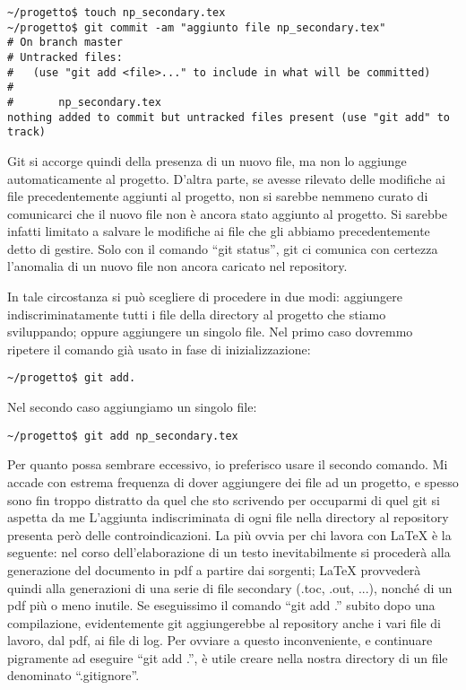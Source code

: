 \documentclass[a4paper,12pt,oneside]{article}
\begin{document}
\begin{lstlisting}
~/progetto$ touch np_secondary.tex
~/progetto$ git commit -am "aggiunto file np_secondary.tex"
# On branch master
# Untracked files:
#   (use "git add <file>..." to include in what will be committed)
#
#       np_secondary.tex
nothing added to commit but untracked files present (use "git add" to track)
\end{lstlisting}

Git si accorge quindi della presenza di un nuovo file, ma non lo aggiunge
automaticamente al progetto. D'altra parte, se avesse rilevato delle modifiche
ai file precedentemente aggiunti al progetto, non si sarebbe nemmeno curato di
comunicarci che il nuovo file non è ancora stato aggiunto al progetto. Si
sarebbe infatti limitato a salvare le modifiche ai file che gli abbiamo
precedentemente detto di gestire. Solo con il comando ``git status'', git ci
comunica con certezza l'anomalia di un nuovo file non ancora caricato nel
repository.

In tale circostanza si può scegliere di procedere in due modi:
aggiungere indiscriminatamente tutti i file della directory al progetto che
stiamo sviluppando; oppure aggiungere un singolo file. Nel primo caso dovremmo
ripetere il comando già usato in fase di inizializzazione:

\begin{lstlisting}
~/progetto$ git add.
\end{lstlisting}

Nel secondo caso aggiungiamo un singolo file:

\begin{lstlisting}
~/progetto$ git add np_secondary.tex
\end{lstlisting}

Per quanto possa sembrare eccessivo, io preferisco usare il secondo comando.
Mi accade con estrema frequenza di
dover aggiungere dei file ad un progetto, e spesso sono fin troppo
distratto da quel che sto scrivendo per occuparmi di quel git si aspetta da me
L'aggiunta indiscriminata di ogni file nella directory al repository presenta
però delle controindicazioni.
La più ovvia per chi lavora con \LaTeX{} è la seguente:
nel corso dell'elaborazione di un testo inevitabilmente si
procederà alla generazione del documento in pdf a partire dai sorgenti;
\LaTeX{} provvederà quindi alla generazioni di una serie di file secondary (.toc,
.out, ...), nonché di un pdf più o meno inutile.
Se eseguissimo il comando ``git add .'' subito dopo una compilazione,
evidentemente git aggiungerebbe al repository anche i vari file di lavoro, dal
pdf, ai file  di log. Per ovviare a questo inconveniente, e continuare
pigramente ad eseguire ``git add .'', è utile creare nella nostra directory di
un file denominato ``.gitignore''.
\end{document}

